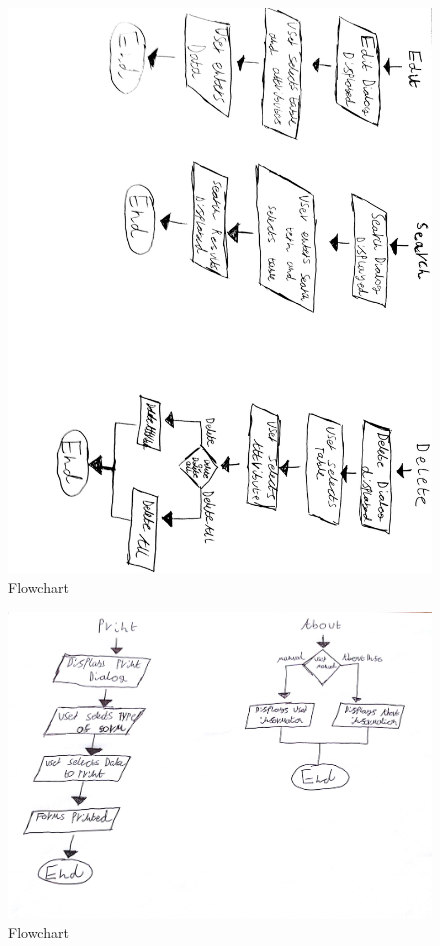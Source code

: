 \begin{figure}[H]
    \includegraphics[width=\textwidth]{flowchart 2.jpg}
    \caption{Flowchart} \label{fig:Flowchart}
\end{figure}

\begin{figure}[H]
    \includegraphics[width=\textwidth]{flowchart1.jpg}
    \caption{Flowchart} \label{fig:Flowchart}
\end{figure}

